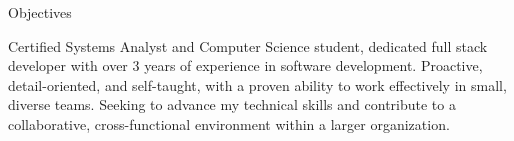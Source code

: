 \begin{rubric}{Objectives}

\entry*Certified Systems Analyst and Computer Science student, dedicated full stack developer with over 3 years of experience in software development. Proactive, detail-oriented, and self-taught, with a proven ability to work effectively in small, diverse teams. Seeking to advance my technical skills and contribute to a collaborative, cross-functional environment within a larger organization.
\end{rubric}